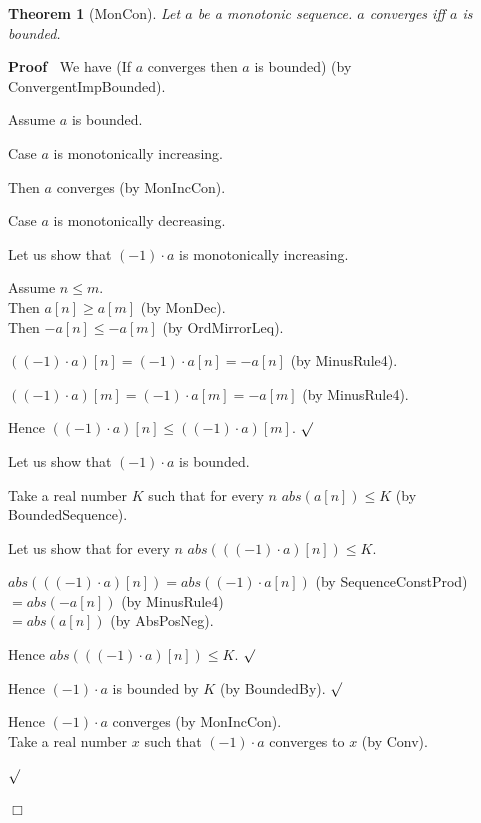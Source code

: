 \documentclass{article}
\newenvironment{forthel}{\begin{leftbar}}{\end{leftbar}}
\newenvironment{proof}{\noindent\textbf{Proof\ }}{\hspace*{\fill}$\Box$\medskip}
\newenvironment{subproof}{\begin{list}{}{}
		\item[\text{Proof}]}{\hfill $\surd$ \end{list}}
\newenvironment{case}{\begin{list}{}{}
		\item[]}{\end{list}}
\newtheorem{theorem}{Theorem}
\newcommand{\cdottwo}{\cdot}
\newcommand{\dotequal}{=}
\begin{document}
\begin{forthel}
	\begin{theorem}[MonCon]
		Let $a$ be a monotonic sequence. $a$ converges iff $a$ is bounded.
	\end{theorem}
	
	\begin{proof}
		We have (If $a$ converges then $a$ is bounded) (by ConvergentImpBounded).
		
		\noindent Assume $a$ is bounded.
		
		\noindent Case $a$ is monotonically increasing.
		\begin{case}
			Then $a$ converges (by MonIncCon). 
		\end{case} 
		Case $a$ is monotonically decreasing.
		\begin{subproof}
			Let us show that $(-1) \cdottwo a$ is monotonically increasing.
			
			\begin{subproof}
				Assume $n \leq m$.\\
				Then $a[n] \geq a[m]$ (by MonDec).\\
				Then $-a[n] \leq -a[m]$ (by OrdMirrorLeq).
				
				$((-1) \cdottwo a)[n] \dotequal (-1) \cdot a[n]
				\dotequal -a[n]$ (by MinusRule4).
				
				$((-1) \cdottwo a)[m] \dotequal (-1) \cdot a[m]
				\dotequal -a[m]$ (by MinusRule4).
				
				Hence $((-1) \cdottwo a)[n] \leq ((-1) \cdottwo a)[m]$.
			\end{subproof}
		
			Let us show that $(-1) \cdottwo a$ is bounded.
			\begin{subproof}
				Take a real number $K$ such that for every $n$ $abs(a[n]) \leq K$ (by BoundedSequence).
				
				Let us show that for every $n$ $abs(((-1) \cdottwo a)[n]) \leq K$.
				\begin{subproof}
					$abs(((-1) \cdottwo a)[n]) \dotequal abs((-1) \cdot a[n])$ (by SequenceConstProd)\\
					$\dotequal abs(-a[n])$ (by MinusRule4)\\
					$\dotequal abs(a[n])$ (by AbsPosNeg).
					
					Hence $abs(((-1) \cdottwo a)[n]) \leq K$.
				\end{subproof}
				Hence $(-1) \cdottwo a$ is bounded by $K$ (by BoundedBy).
			\end{subproof}
			Hence $(-1) \cdottwo a$ converges (by MonIncCon).\\
			Take a real number $x$ such that $(-1) \cdottwo a$ converges to $x$ (by Conv).
			

\end{subproof}
\end{proof}
\end{forthel}
\end{document}

